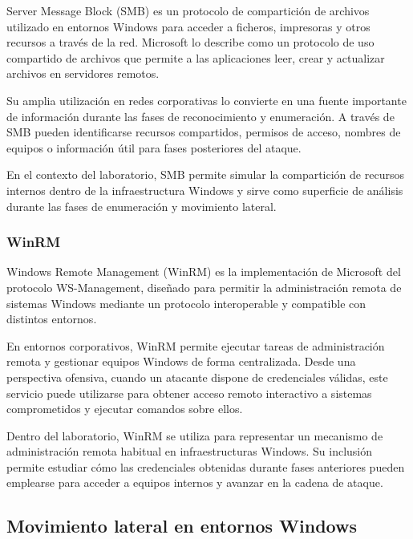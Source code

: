 Server Message Block (SMB) es un protocolo de compartición de archivos utilizado en entornos Windows para acceder a ficheros, impresoras y otros recursos a través de la red. Microsoft lo describe como un protocolo de uso compartido de archivos que permite a las aplicaciones leer, crear y actualizar archivos en servidores remotos.

Su amplia utilización en redes corporativas lo convierte en una fuente importante de información durante las fases de reconocimiento y enumeración. A través de SMB pueden identificarse recursos compartidos, permisos de acceso, nombres de equipos o información útil para fases posteriores del ataque.

En el contexto del laboratorio, SMB permite simular la compartición de recursos internos dentro de la infraestructura Windows y sirve como superficie de análisis durante las fases de enumeración y movimiento lateral.


\subsubsection{WinRM}

Windows Remote Management (WinRM) es la implementación de Microsoft del protocolo WS-Management, diseñado para permitir la administración remota de sistemas Windows mediante un protocolo interoperable y compatible con distintos entornos.

En entornos corporativos, WinRM permite ejecutar tareas de administración remota y gestionar equipos Windows de forma centralizada. Desde una perspectiva ofensiva, cuando un atacante dispone de credenciales válidas, este servicio puede utilizarse para obtener acceso remoto interactivo a sistemas comprometidos y ejecutar comandos sobre ellos.

Dentro del laboratorio, WinRM se utiliza para representar un mecanismo de administración remota habitual en infraestructuras Windows. Su inclusión permite estudiar cómo las credenciales obtenidas durante fases anteriores pueden emplearse para acceder a equipos internos y avanzar en la cadena de ataque.


\subsection{Movimiento lateral en entornos Windows}

